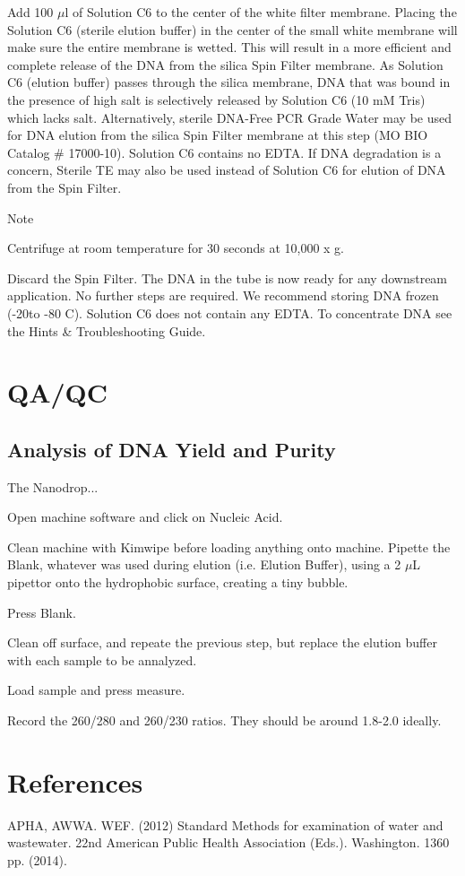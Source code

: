 \documentclass[12pt]{../SOP3_alpha}
\begin{document}
\NP Add 100 $\mu$l of Solution C6 to the center of the white filter membrane. Placing the Solution C6 (sterile elution buffer) in the center of the small white membrane will make sure the entire membrane is wetted. This will result in a more efficient and complete release of the DNA from the silica Spin Filter membrane. As Solution C6 (elution buffer) passes through the silica membrane, DNA that
was bound in the presence of high salt is selectively released by Solution C6 (10 mM Tris) which lacks salt. Alternatively, sterile DNA-Free PCR Grade Water may be used for DNA elution from the silica Spin Filter membrane at this step (MO BIO Catalog \# 17000-10). Solution C6 contains no EDTA. If DNA degradation is a concern, Sterile TE may also be used instead of Solution C6 for elution of DNA from the Spin Filter.

Note

\NP Centrifuge at room temperature for 30 seconds at 10,000 x g.

\NP Discard the Spin Filter. The DNA in the tube is now ready for any downstream application. No further steps are required. We recommend storing DNA frozen (-20\degree to -80 \degree C). Solution C6 does not contain any EDTA. To concentrate DNA see the Hints \& Troubleshooting Guide.

\section{QA/QC}

\subsection*{Analysis of DNA Yield and Purity}

\NP The Nanodrop...

\NP Open machine software and click on Nucleic Acid.

\NP Clean machine with Kimwipe before loading anything onto machine. 
\NP Pipette the Blank, whatever was used during elution (i.e. Elution Buffer), using a 2 $\mu$L pipettor onto the hydrophobic surface, creating a tiny bubble.

\NP Press Blank.

\NP Clean off surface, and repeate the previous step, but replace the elution buffer with each sample to be annalyzed.

\NP Load sample and press measure.

\NP Record the 260/280 and 260/230 ratios. They should be around 1.8-2.0 ideally. 


\section{References}

\NP APHA, AWWA. WEF. (2012) Standard Methods for examination of water and wastewater. 22nd American Public Health Association (Eds.). Washington. 1360 pp. (2014).
\end{document}
